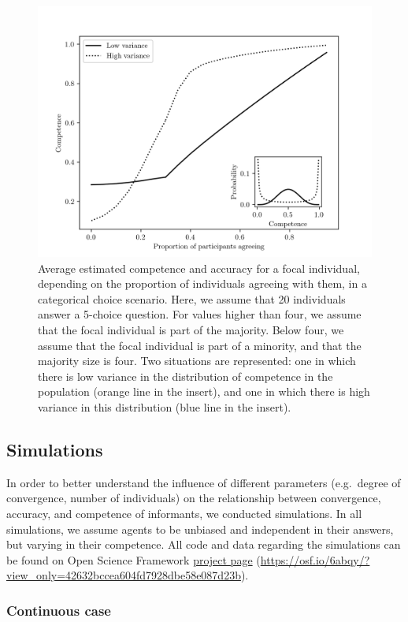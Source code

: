 \documentclass[
  doc,floatsintext]{apa6}
\begin{document}
\begin{figure}

\includegraphics[width=0.75\linewidth]{figures/figure_Benoit-2} \hfill{}

\caption{Average estimated competence and accuracy for a focal individual, depending on the proportion of individuals agreeing with them, in a categorical choice scenario. Here, we assume that 20 individuals answer a 5-choice question. For values higher than four, we assume that the focal individual is part of the majority. Below four, we assume that the focal individual is part of a minority, and that the majority size is four. Two situations are represented: one in which there is low variance in the distribution of competence in the population (orange line in the insert), and one in which there is high variance in this distribution (blue line in the insert).}\label{fig:figure-Benoit-2}
\end{figure}

\subsection{Simulations}\label{simulations}

In order to better understand the influence of different parameters (e.g.~degree of convergence, number of individuals) on the relationship between convergence, accuracy, and competence of informants, we conducted simulations. In all simulations, we assume agents to be unbiased and independent in their answers, but varying in their competence. All code and data regarding the simulations can be found on Open Science Framework \href{https://osf.io/6abqy/?view_only=42632bccea604fd7928dbe58e087d23b}{project page} (\url{https://osf.io/6abqy/?view_only=42632bccea604fd7928dbe58e087d23b}).

\subsubsection{Continuous case}\label{continuous-case}
\end{document}

